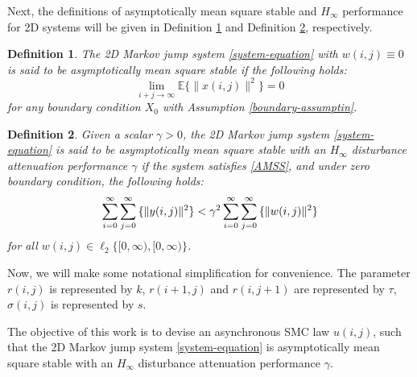 \documentclass[conference]{IEEEtran}
\newtheorem{definition}{Definition}
\begin{document}
	Next, the definitions of  asymptotically mean square stable and $H_{\infty}$ performance for 2D systems will be given in Definition \ref{mean-square-stable} and Definition \ref{H_infty-performance}, respectively.
	
	\begin{definition}\label{mean-square-stable}
	The 2D Markov jump system \eqref{system-equation} with $w(i,j)\equiv0$ is said to be asymptotically mean square stable if the following holds:
	\begin{equation}\label{AMSS}
			\lim\limits_{i+j\to\infty}\mathbb{E}\{\|x(i,j)\|^{2}\} = 0
	\end{equation}
	for any boundary condition $X_{0}$ with Assumption \ref{boundary-assumptin}.
	\end{definition}


	\begin{definition}\label{H_infty-performance}
		Given a scalar $\gamma>0$, the 2D Markov jump system \eqref{system-equation} is said to be asymptotically mean square stable with an $H_{\infty}$ disturbance attenuation performance $\gamma$ if the system satisfies \eqref{AMSS}, and under zero boundary condition, the following holds:
		\begin{equation}
			\sum_{i=0}^{\infty}\sum_{j=0}^{\infty}\mathbb\{\|y(i,j)\|^{2}\} <  \gamma^{2} \sum_{i=0}^{\infty}\sum_{j=0}^{\infty}\mathbb\{\|w(i,j)\|^{2}\}
		\end{equation}
		for all $w(i,j)\in\ell_{2}\{[0,\infty),[0,\infty)\}$.
	\end{definition}
	
	Now, we will make some notational simplification for convenience. The parameter $r(i,j)$ is represented by $k$, $r(i+1,j)$ and $r(i,j+1)$ are represented by $\tau$, $\sigma(i,j)$ is represented by $s$. 
	
	
	
	 The objective of this work is to devise an asynchronous  SMC law $u(i,j)$, such that the 2D Markov jump system \eqref{system-equation} is asymptotically mean square stable with an $H_{\infty}$ disturbance attenuation performance $\gamma$. 
\end{document}

